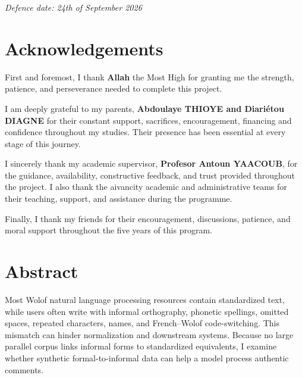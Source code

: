 \documentclass[12pt, a4paper, twoside, openany]{report}
\newcommand{\defensedate}{24th of September 2026}
\begin{document}
\begin{titlepage}
  \vspace{1.5cm}

  \begin{center}
    {\color{aivancityGray}\itshape Defence date: \defensedate}
  \end{center}

  \restoregeometry
\end{titlepage}


\chapter*{Acknowledgements}
First and foremost, I thank \textbf{Allah} the Most High for granting me the strength, patience, and perseverance needed to complete this project.

I am deeply grateful to my parents, \textbf{Abdoulaye THIOYE and Diariétou DIAGNE} for their constant support, sacrifices, encouragement, financing and confidence throughout my studies. Their presence has been essential at every stage of this journey.

I sincerely thank my academic supervisor, \textbf{Profesor Antoun YAACOUB}, for the guidance, availability, constructive feedback, and trust provided throughout the project. I also thank the aivancity academic and administrative teams for their teaching, support, and assistance during the programme.

Finally, I thank my friends for their encouragement, discussions, patience, and moral support throughout the five years of this program.

\newpage

\chapter*{Abstract}
Most Wolof natural language processing resources contain standardized text, while users often write with informal orthography, phonetic spellings, omitted spaces, repeated characters, names, and French--Wolof code-switching. This mismatch can hinder normalization and downstream systems. Because no large parallel corpus links informal forms to standardized equivalents, I examine whether synthetic formal-to-informal data can help a model process authentic comments.
\end{document}
